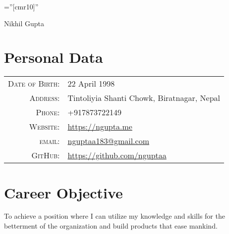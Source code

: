 \documentclass[a4paper,10pt]{article}
\begin{document}

\pagestyle{empty} %

\font\fb=''[cmr10]'' %

\par{\centering
		{\Huge Nikhil Gupta
	}\bigskip\par}

\section{Personal Data}

\begin{tabular}{rl}
    \textsc{Date of Birth:} & 22 April 1998 \\
    \textsc{Address:}   & Tintoliyia Shanti Chowk, Biratnagar, Nepal \\
    \textsc{Phone:}     & +917873722149\\
    \textsc{Website:}     & \url {https://ngupta.me} \\
    \textsc{email:}     & \href{mailto:nguptaa183@gmail.com}{nguptaa183@gmail.com}\\
    \textsc{GitHub:}     & \url {https://github.com/nguptaa} \\
\end{tabular}

\section{Career Objective}
\footnotesize{To achieve a position where I can utilize my knowledge and skills for the betterment of the organization and build products that ease mankind.}



\end{document}
